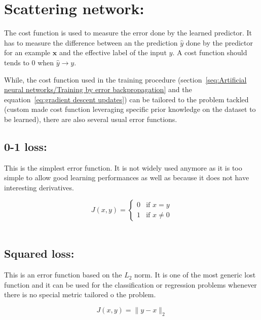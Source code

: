\documentclass[a4paper,11pt]{report}
\begin{document}
 
	\section{Scattering network:}
		\label{seq:Artificial neural networks/The cost function}
		The cost function is used to measure the error done by the learned predictor. It has to measure the difference between an the prediction $\hat{y}$ done by the predictor for an example $\mathbf{x}$ and the effective label of the input $y$. A cost function should tends to $0$ when $\hat{y} \rightarrow y$.\\\par
		
		While, the cost function used in the training procedure (section~\ref{seq:Artificial neural networks/Training by error backpropagation} and the equation~\ref{eq:gradient descent updates}) can be tailored to the problem tackled (custom made cost function leveraging specific prior knowledge on the dataset to be learned), there are also several usual error functions.
    
		\subsection{0-1 loss:}
			This is the simplest error function. It is not widely used anymore as it is too simple to allow good learning performances as well as because it does not have interesting derivatives.
			
			\begin{equation}
				J(x,y) =
				\begin{cases}
					0 & \text{if } x = y \\
					1 & \text{if } x \neq 0
				\end{cases}
			\end{equation}\\

      
		\subsection{Squared loss:}
			This is an error function based on the $L_{2}$ norm. It is one of the most generic lost function and it can be used for the classification or regression problems whenever there is no special metric tailored o the problem.
			
			\begin{equation}
				J(x,y) = \|y-x\|_{2}
				\label{eq:squared}
			\end{equation}\\
			
\end{document}
